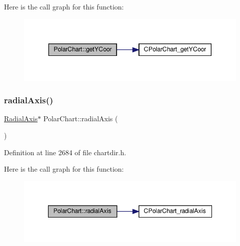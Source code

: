 Here is the call graph for this function\+:
\nopagebreak
\begin{figure}[H]
\begin{center}
\leavevmode
\includegraphics[width=343pt]{class_polar_chart_a1f64ec407df2fdd1c80bbc7fd9fb018b_cgraph}
\end{center}
\end{figure}
\mbox{\label{class_polar_chart_ab29bc179de261a048e3c493324ff85f1}} 
\subsubsection{\texorpdfstring{radial\+Axis()}{radialAxis()}}
{\footnotesize\ttfamily \hyperlink{chartdir_8h_a4e17084867bb8e096e6e13b956e538ce}{Radial\+Axis}$\ast$ Polar\+Chart\+::radial\+Axis (\begin{DoxyParamCaption}{ }\end{DoxyParamCaption})\hspace{0.3cm}{\ttfamily [inline]}}



Definition at line 2684 of file chartdir.\+h.

Here is the call graph for this function\+:
\nopagebreak
\begin{figure}[H]
\begin{center}
\leavevmode
\includegraphics[width=347pt]{class_polar_chart_ab29bc179de261a048e3c493324ff85f1_cgraph}
\end{center}
\end{figure}
\mbox{\label{class_polar_chart_a781271d5381dfe4fe6164384ebbed7a1}} 

